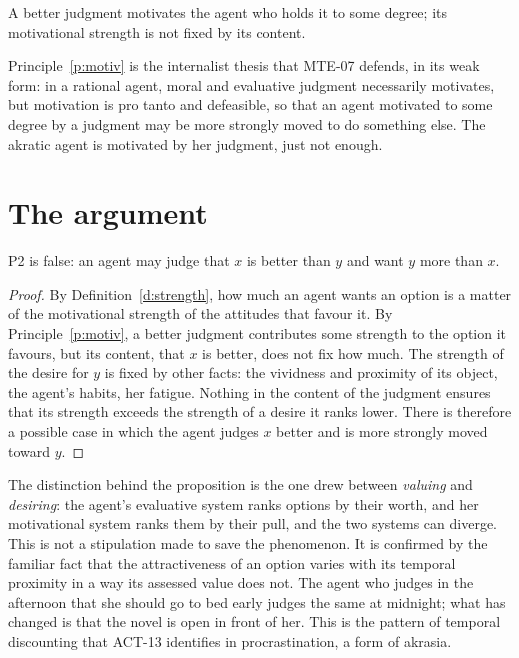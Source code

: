 \documentclass{situationist-preprint}
\begin{document}
\begin{principle}\label{p:motiv}
A better judgment motivates the agent who holds it to some degree; its motivational strength is not fixed by its content.
\end{principle}

Principle~\ref{p:motiv} is the internalist thesis that MTE-07 defends, in its weak form: in a rational agent, moral and evaluative judgment necessarily motivates, but motivation is pro tanto and defeasible, so that an agent motivated to some degree by a judgment may be more strongly moved to do something else. The akratic agent is motivated by her judgment, just not enough.

\section{The argument}

\begin{proposition}\label{p:p2}
P2 is false: an agent may judge that $x$ is better than $y$ and want $y$ more than $x$.
\end{proposition}

\begin{proof}
By Definition~\ref{d:strength}, how much an agent wants an option is a matter of the motivational strength of the attitudes that favour it. By Principle~\ref{p:motiv}, a better judgment contributes some strength to the option it favours, but its content, that $x$ is better, does not fix how much. The strength of the desire for $y$ is fixed by other facts: the vividness and proximity of its object, the agent's habits, her fatigue. Nothing in the content of the judgment ensures that its strength exceeds the strength of a desire it ranks lower. There is therefore a possible case in which the agent judges $x$ better and is more strongly moved toward $y$.
\end{proof}

The distinction behind the proposition is the one \citet{Watson1975} drew between \emph{valuing} and \emph{desiring}: the agent's evaluative system ranks options by their worth, and her motivational system ranks them by their pull, and the two systems can diverge. This is not a stipulation made to save the phenomenon. It is confirmed by the familiar fact that the attractiveness of an option varies with its temporal proximity in a way its assessed value does not. The agent who judges in the afternoon that she should go to bed early judges the same at midnight; what has changed is that the novel is open in front of her. This is the pattern of temporal discounting that ACT-13 identifies in procrastination, a form of akrasia.
\end{document}

